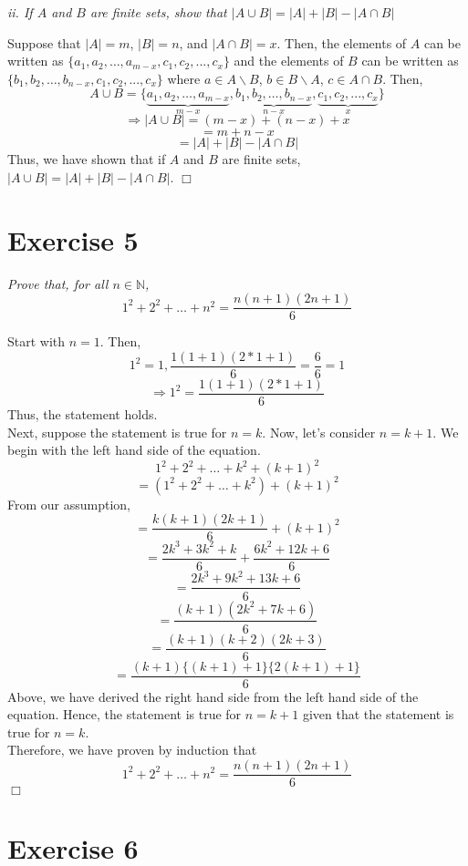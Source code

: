 \documentclass[
]{article}
\begin{document}
\emph{ii. If \(A\) and \(B\) are finite sets, show that
\(|A\cup B| = |A| + |B| - |A\cap B|\)}

Suppose that \(|A| = m\), \(|B| = n\), and \(|A \cap B|=x\). Then, the
elements of \(A\) can be written as
\(\{a_1, a_2, \dots, a_{m-x}, c_1, c_2, ..., c_x\}\) and the elements of
\(B\) can be written as
\(\{b_1, b_2, \dots, b_{n-x},c_1, c_2, ..., c_x\}\) where
\(a \in A \backslash B\), \(b \in B \backslash A\), \(c \in A \cap B\).
Then,
\[A\cup B = \{\underbrace{a_1, a_2, \dots, a_{m-x}}_{m-x}, \underbrace{b_1, b_2, \dots, b_{n-x}}_{n-x}, \underbrace{c_1, c_2, ..., c_x}_x\}\]
\[\Rightarrow |A \cup B| = (m - x) + (n - x) + x\] \[= m + n -x\]
\[= |A| + |B| - |A\cap B|\] Thus, we have shown that if \(A\) and \(B\)
are finite sets, \(|A\cup B| = |A| + |B| - |A\cap B|\). \hfill \(\Box\)

\hypertarget{exercise-5}{%
\section{Exercise 5}\label{exercise-5}}

\emph{Prove that, for all \(n \in \mathbb{N}\),}
\[1^2 + 2^2 + \dots + n^2 = \frac{n(n+1)(2n+1)}{6}\]

Start with \(n=1\). Then,
\[1^2 =1,  \frac{1(1+1)(2*1+1)}{6} = \frac{6}{6} = 1\]
\[\Rightarrow 1^2 = \frac{1(1+1)(2*1+1)}{6} \] Thus, the statement
holds.\\
Next, suppose the statement is true for \(n = k\). Now, let's consider
\(n = k+1\). We begin with the left hand side of the equation.
\[1^2 + 2^2 + \dots + k^2 + (k+1)^2\]
\[= (1^2 + 2^2 + \dots + k^2) + (k+1)^2\] From our assumption,
\[=\frac{k(k+1)(2k+1)}{6} + (k+1)^2\]
\[=\frac{2k^3 + 3k^2 + k}{6} + \frac{6k^2 + 12k + 6}{6}\]
\[= \frac{2k^3 + 9k^2 + 13k + 6}{6}\]
\[=\frac{(k+1)(2k^2 + 7k + 6)}{6}\] \[=\frac{(k+1)(k+2)(2k + 3)}{6}\]
\[=\frac{(k+1)\{(k+1)+1\}\{2(k + 1)+1\}}{6}\] Above, we have derived the
right hand side from the left hand side of the equation. Hence, the
statement is true for \(n = k+1\) given that the statement is true for
\(n = k\).\\
Therefore, we have proven by induction that
\[1^2 + 2^2 + \dots + n^2 = \frac{n(n+1)(2n+1)}{6}\] \hfill \(\Box\)

\hypertarget{exercise-6}{%
\section{Exercise 6}\label{exercise-6}}
\end{document}
